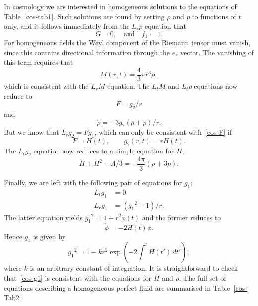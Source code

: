 \documentclass[a4paper]{article}
\numberwithin{equation}{section}
\newcommand{\rhodot}{\dot{\rho}}
\newcommand{\Hdt}{\dot{H}}
\begin{document}
In cosmology we are interested in homogeneous solutions to the
equations of Table~\ref{cos-tab1}.  Such solutions are found by
setting $\rho$ and $p$ to functions of $t$ only, and it follows
immediately from the $L_r p$ equation that
%
\begin{equation}
G=0, \quad \mbox{and} \quad  f_1 = 1.
\end{equation}
%
For homogeneous fields the Weyl component of the Riemann tensor must
vanish, since this contains directional information through the $e_r$
vector.  The vanishing of this term requires that
%
\begin{equation}
M(r,t) = \frac{4}{3} \pi r^3 \rho,
\label{cos-Mvsrho}
\end{equation}
%
which is consistent with the $L_r M$ equation.  The $L_tM$ and $L_t
\rho$ equations now reduce to
%
\begin{equation}
F = g_2 /r
\label{cos-F}
\end{equation}
%
and
%
\begin{equation}
\rhodot = -3 g_2 (\rho +p) /r.
\end{equation}
%
But we know that $L_r g_2 = F g_1$, which can only be consistent
with~\eqref{cos-F} if
%
\begin{equation}
F = H(t), \qquad g_2(r,t) = r H(t).
\end{equation}
%
The $L_t g_2$ equation now reduces to a simple equation for $\Hdt$,
%
\begin{equation}
\Hdt + H^2 - \Lambda /3 = - \frac{4 \pi}{3} (\rho + 3 p).
\end{equation}
%

Finally, we are left with the following pair of equations for $g_1$:
%
\begin{align}
L_t g_1 &= 0 \\
L_r g_1 &= ({g_1}^2 -1)/r.
\end{align}
%
The latter equation yields ${g_1}^2 = 1 +r^2 \phi(t)$ and the former
reduces to 
%
\begin{equation}
\dot{\phi} = -2H(t) \phi.
\end{equation}
%
Hence $g_1$ is given by 
%
\begin{equation}
{g_1}^2 = 1 - k r^2 \exp \left( -2 \int^t H(t') \, dt' \right),
\label{cos-g1}
\end{equation}
%
where $k$ is an arbitrary constant of integration.  It is
straightforward to check that~\eqref{cos-g1} is consistent with the
equations for $\Hdt$ and $\rhodot$.  The full set of equations
describing a homogeneous perfect fluid are summarised in
Table~\ref{cos-Tab2}.
\end{document}
